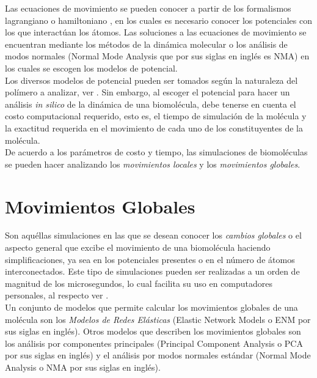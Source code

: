 Las ecuaciones de movimiento se pueden conocer a partir de los formalismos lagrangiano o hamiltoniano \cite{Goldstein2001ClassicalMechanics}, en los cuales es necesario conocer los potenciales con los que interact\'{u}an los \'{a}tomos. Las soluciones a las ecuaciones de movimiento se encuentran mediante los m\'{e}todos de la din\'{a}mica molecular o los an\'{a}lisis de modos normales (Normal Mode Analysis que por sus siglas en ingl\'{e}s es NMA) en los cuales se escogen los modelos de potencial.\\

Los diversos modelos de potencial pueden ser tomados seg\'{u}n la naturaleza del pol\'{i}mero a analizar, ver \cite{Lezon2009ElasticViruses}. Sin embargo, al escoger el potencial  para hacer un an\'{a}lisis \textit{in silico} de la din\'{a}mica de una biomol\'{e}cula, debe tenerse en cuenta el costo computacional requerido, esto es, el tiempo de simulaci\'{o}n de la mol\'{e}cula y la exactitud requerida en el movimiento de cada uno de los constituyentes de la mol\'{e}cula.\\

De acuerdo a los par\'{a}metros de costo y tiempo, las simulaciones de biomol\'{e}culas se pueden hacer analizando los \textit{movimientos locales} y los \textit{movimientos globales}.

\section{Movimientos Globales}

Son aqu\'{e}llas simulaciones en las que se desean conocer los \textit{cambios globales} o el aspecto general que excibe el movimiento de una biomol\'{e}cula haciendo simplificaciones, ya sea en los potenciales presentes o en el n\'{u}mero de \'{a}tomos interconectados. Este tipo de simulaciones pueden ser realizadas a un orden de magnitud de los microsegundos, lo cual facilita su uso en computadores personales, al respecto ver \cite{Gur2013GlobalPredictions.}.\\

Un conjunto de modelos que permite calcular los movimientos globales de una mol\'{e}cula son los \textit{Modelos de Redes El\'{a}sticas} (Elastic Network Models o ENM por sus siglas en ingl\'{e}s).
 Otros modelos que describen los movimientos globales son los an\'{a}lisis por componentes principales (Principal Component Analysis o PCA por sus siglas en ingl\'{e}s) y el an\'{a}lisis por modos normales est\'{a}ndar (Normal Mode Analysis o NMA por sus siglas en ingl\'{e}s).
 
